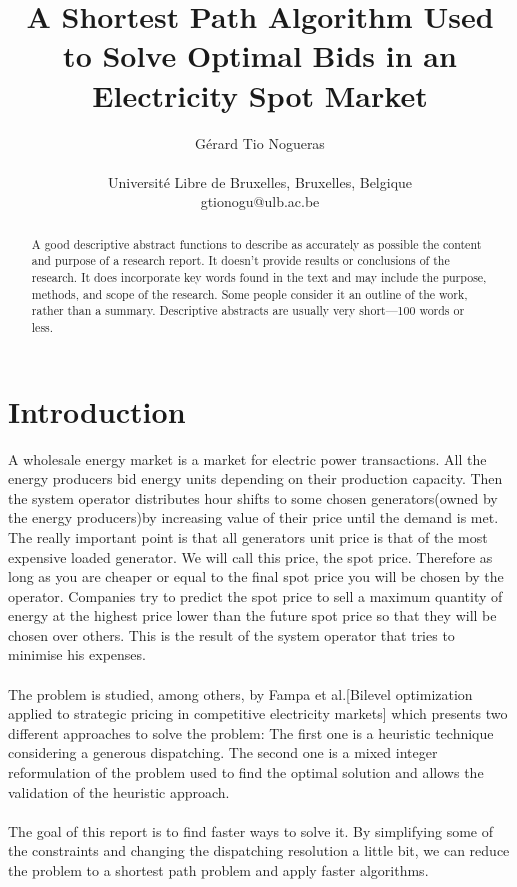 \documentclass[letterpaper]{article}
\title{A Shortest Path Algorithm Used to Solve Optimal Bids in an Electricity Spot Market}
\author{G\'erard Tio Nogueras \\
\mbox{}\\
Universit\'e Libre de Bruxelles, Bruxelles, Belgique\\
gtionogu@ulb.ac.be}
\begin{document}
\maketitle

\begin{abstract}
A good descriptive abstract functions to describe as accurately as possible the content and purpose 
of a research report. It doesn’t  provide results or conclusions of the research. It does incorporate 
key words found in the text and may include the purpose, methods, and scope of the research. Some
people consider it an outline of the work, rather than a summary. Descriptive abstracts are usually 
very short—100 words or less.
\end{abstract}

\section{Introduction}

A wholesale energy market is a market for electric power transactions. All the energy producers bid energy units depending on their production capacity. Then the system operator distributes hour shifts to some chosen generators(owned by the energy producers)by increasing value of their price until the demand is met. The really important point is that all generators unit price is that of the most expensive loaded generator. We will call this price, the spot price. Therefore as long as you are cheaper or equal to the final spot price you will be chosen by the operator. Companies try to predict the spot price to sell a maximum quantity of energy at the highest price lower than the future spot price so that they will be chosen over others.
This is the result of the system operator that tries to minimise his expenses.\\ \\
The problem is studied, among others, by Fampa et al.[Bilevel optimization applied to strategic pricing in competitive electricity markets] which presents two different approaches to solve the problem: The first one is a heuristic technique considering a generous dispatching.
The second one is a mixed integer reformulation of the problem used to find the optimal solution and allows the validation of the heuristic approach.\\ \\
The goal of this report is to find faster ways to solve it. By simplifying some of the constraints and changing the dispatching resolution a little bit, we can reduce the problem to a shortest path problem and apply faster algorithms.
\end{document}
